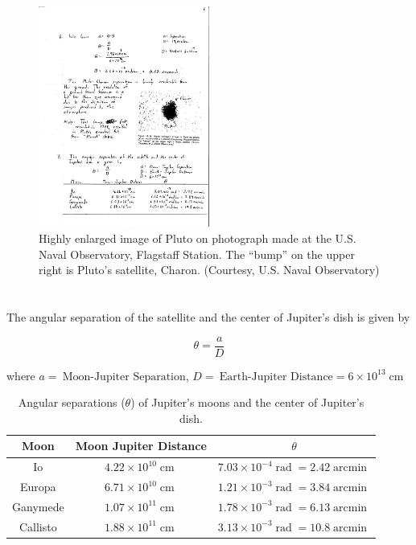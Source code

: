 \documentclass[11pt]{scrartcl}
\DeclareMathOperator{\cm}{cm}
\DeclareMathOperator{\rad}{rad}
\DeclareMathOperator{\arcmin}{arcmin}
\newcommand\pow[2]{\ensuremath{#1 \times 10^{#2}}}
\begin{document}
\begin{figure}[H]
\centering
\includegraphics[width=0.5\textwidth]{figures/problem-set-1-pluto-charon.pdf}
\caption{Highly enlarged image of Pluto on photograph made at the U.S. Naval Observatory, Flagstaff Station. The ``bump'' on the upper right is Pluto's satellite, Charon. (Courtesy, U.S. Naval Observatory)}
\label{fig-problem-set-1-pluto-charon}
\end{figure}


\section{}

The angular separation of the satellite and the center of Jupiter's dish is given by

\[\theta = \frac{a}{D}\]

where $a = \ \text{Moon-Jupiter Separation}$, $D = \ \text{Earth-Jupiter Distance} = \pow{6}{13}\cm$

\begin{table}[H]
\centering
\begin{tabular}{c c c}
\toprule
Moon & Moon Jupiter Distance & $\theta$ \\
\midrule
Io & $\pow{4.22}{10}\cm$ & $\pow{7.03}{-4}\rad = 2.42\arcmin$ \\
Europa & $\pow{6.71}{10}\cm$ & $\pow{1.21}{-3}\rad = 3.84\arcmin$ \\
Ganymede & $\pow{1.07}{11}\cm$ & $\pow{1.78}{-3}\rad = 6.13\arcmin$ \\
Callisto & $\pow{1.88}{11}\cm$ & $\pow{3.13}{-3}\rad = 10.8\arcmin$ \\
\bottomrule
\end{tabular}
\caption{Angular separations ($\theta$) of Jupiter's moons and the center of Jupiter's dish.}
\end{table}
\end{document}
